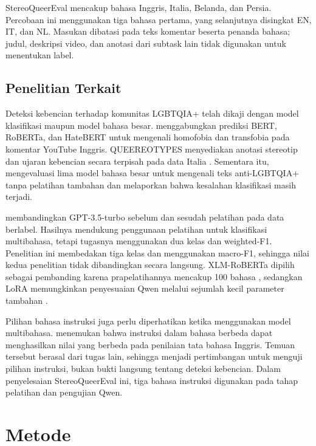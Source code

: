 \documentclass[11pt]{article}
\begin{document}
StereoQueerEval mencakup bahasa Inggris, Italia, Belanda, dan Persia. Percobaan ini menggunakan tiga bahasa pertama, yang selanjutnya disingkat EN, IT, dan NL. Masukan dibatasi pada teks komentar beserta penanda bahasa; judul, deskripsi video, dan anotasi dari subtask lain tidak digunakan untuk menentukan label.

\subsection{Penelitian Terkait}
Deteksi kebencian terhadap komunitas LGBTQIA+ telah dikaji dengan model klasifikasi maupun model bahasa besar. \citet{nozza-2022-nozza} menggabungkan prediksi BERT, RoBERTa, dan HateBERT untuk mengenali homofobia dan transfobia pada komentar YouTube Inggris. QUEEREOTYPES menyediakan anotasi stereotip dan ujaran kebencian secara terpisah pada data Italia \citep{cignarella-etal-2024-queereotypes}. Sementara itu, \citet{nguyen-etal-2025-leveraging} mengevaluasi lima model bahasa besar untuk mengenali teks anti-LGBTQIA+ tanpa pelatihan tambahan dan melaporkan bahwa kesalahan klasifikasi masih terjadi.

\citet{chan-etal-2024-hate} membandingkan GPT-3.5-turbo sebelum dan sesudah pelatihan pada data berlabel. Hasilnya mendukung penggunaan pelatihan untuk klasifikasi multibahasa, tetapi tugasnya menggunakan dua kelas dan weighted-F1. Penelitian ini membedakan tiga kelas dan menggunakan macro-F1, sehingga nilai kedua penelitian tidak dibandingkan secara langsung. XLM-RoBERTa dipilih sebagai pembanding karena prapelatihannya mencakup 100 bahasa \citep{conneau-etal-2020-unsupervised}, sedangkan LoRA memungkinkan penyesuaian Qwen melalui sejumlah kecil parameter tambahan \citep{hu-etal-2021-lora}.

Pilihan bahasa instruksi juga perlu diperhatikan ketika menggunakan model multibahasa. \citet{behzad-etal-2024-ask} menemukan bahwa instruksi dalam bahasa berbeda dapat menghasilkan nilai yang berbeda pada penilaian tata bahasa Inggris. Temuan tersebut berasal dari tugas lain, sehingga menjadi pertimbangan untuk menguji pilihan instruksi, bukan bukti langsung tentang deteksi kebencian. Dalam penyelesaian StereoQueerEval ini, tiga bahasa instruksi digunakan pada tahap pelatihan dan pengujian Qwen.

\section{Metode}
\end{document}

